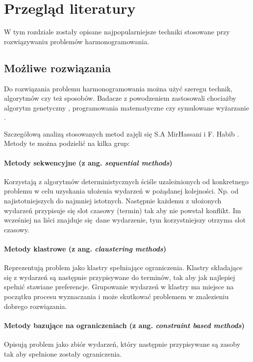 \chapter{Przegląd literatury}
W tym rozdziale zostały opisane najpopularniejsze techniki stosowane przy
rozwiązywaniu problemów harmonogramowania.
\section{Możliwe rozwiązania}
Do rozwiązania problemu harmonogramowania można użyć szeregu technik, algorytmów
czy też sposobów. Badacze z powodzeniem zastosowali chociażby algorytm
genetyczny \cite{assi2018}, programowania matematyczne \cite{yakoob2007} czy symulowane wyżarzanie \cite{marzec2020}.

Szczegółową analizą stosowanych metod zajęli się S.A MirHassani i F. Habib
\cite{habib2013}. Metody te można podzielić na kilka grup:

\subsubsection{Metody sekwencyjne (z ang. \emph{sequential methods})}
Korzystają z algorytmów deterministycznych ściśle uzależnionych od konkretnego
problemu w celu uzyskania ułożenia wydarzeń w pożądanej kolejności. Np. od
najistotniejszych do najmniej istotnych. Następnie każdemu z
ułożonych wydarzeń przypisuje się slot czasowy (termin) tak aby nie powstał
konflikt. Im wcześniej na liści znajduje się dane wydarzenie, tym korzystniejszy
otrzyma slot czasowy.

\subsubsection{Metody klastrowe (z ang. \emph{claustering methods})} 
Reprezentują problem jako klastry spełniające
ograniczenia. Klastry składające się z wydarzeń są następnie przypisywane do
terminów, tak aby jak najlepiej spełnić stawiane preferencje. Grupowanie
wydarzeń w klastry ma miejsce na początku procesu wyznaczania i może skutkować
problemem w znalezieniu dobrego rozwiązania.

\subsubsection{Metody bazujące na ograniczeniach (z ang. \emph{constraint based methods})} 
Opisują problem jako zbiór wydarzeń, który
następnie przypisywane są zasoby tak aby spełnione zostały ograniczenia.

